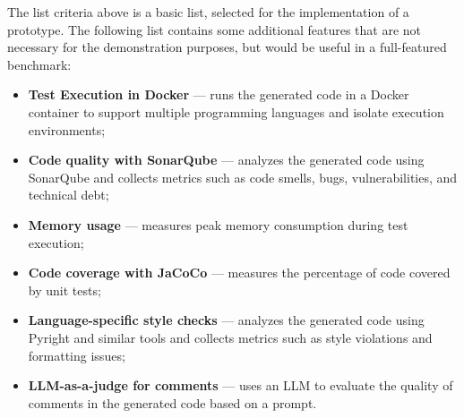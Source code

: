 The list criteria above is a basic list, selected for the implementation of a prototype.
The following list contains some additional features that are not necessary for the demonstration purposes, but would be useful in a full-featured benchmark:
\begin{itemize}
    \item \textbf{Test Execution in Docker} --- runs the generated code in a Docker container to support multiple programming languages and isolate execution environments;
    \item \textbf{Code quality with SonarQube} --- analyzes the generated code using SonarQube and collects metrics such as code smells, bugs, vulnerabilities, and technical debt;
    \item \textbf{Memory usage} --- measures peak memory consumption during test execution;
    \item \textbf{Code coverage with JaCoCo} --- measures the percentage of code covered by unit tests;
    \item \textbf{Language-specific style checks} --- analyzes the generated code using Pyright and similar tools and collects metrics such as style violations and formatting issues;
    \item \textbf{LLM-as-a-judge for comments} --- uses an LLM to evaluate the quality of comments in the generated code based on a prompt.
\end{itemize}

